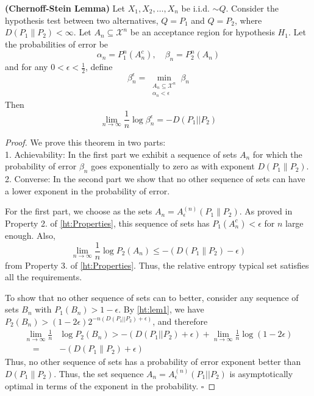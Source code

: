 \documentclass{article}
\newcommand{\bfs}[1]{\textbf{({#1})}}
\begin{document}
\begin{thma}{\bfs{Chernoff-Stein Lemma}}\label{ht:Chernoff-Stein}
Let $X_{1}, X_{2}, \ldots, X_{n}$ be
i.i.d. $\sim Q .$ Consider the hypothesis test between two alternatives, $Q=P_{1}$ and $Q=P_{2}$, where $D\left(P_{1} \| P_{2}\right)<\infty$. Let $A_{n} \subseteq \mathcal{X}^{n}$ be an acceptance region for hypothesis $H_{1} .$ Let the probabilities of error be
$$
\alpha_{n}=P_{1}^{n}\left(A_{n}^{c}\right), \quad \beta_{n}=P_{2}^{n}\left(A_{n}\right)
$$
and for any $0<\epsilon<\frac{1}{2}$, define
$$
\beta_{n}^{\epsilon}=\min _{
\begin{array}{c}
A_{n} \subseteq \mathcal{X}^{n} \\
\alpha_{n}<\epsilon
\end{array}
} \beta_{n}
$$
Then
$$
\lim _{n \rightarrow \infty} \frac{1}{n} \log \beta_{n}^{\epsilon}=-D\left(P_{1}|| P_{2}\right)
$$
\end{thma} 
\begin{proof}
We prove this theorem in two parts:\\
1.  Achievability: In the first part we exhibit a sequence of sets $A_{n}$ for which the probability of error $\beta_{n}$ goes exponentially to zero as with exponent $D\left(P_{1} \| P_{2}\right) .$ \\
2. Converse: In the second part we show that no other sequence of sets can have a lower exponent in the probability of error. 

For the first part, we choose as the sets $A_{n}=A_{\epsilon}^{(n)}\left(P_{1} \| P_{2}\right) .$ As proved in Property 2. of \cref{ht:Properties}, this sequence of sets has $P_{1}\left(A_{n}^{c}\right)<\epsilon$ for $n$ large enough. Also,
$$
\lim _{n \rightarrow \infty} \frac{1}{n} \log P_{2}\left(A_{n}\right) \leq-\left(D\left(P_{1} \| P_{2}\right)-\epsilon\right)
$$
from Property 3. of \cref{ht:Properties}. Thus, the relative entropy typical set satisfies all the requirements.

To show that no other sequence of sets can to better, consider any sequence of sets $B_{n}$ with $P_{1}\left(B_{n}\right)>1-\epsilon$. By \cref{ht:lem1}, we have $P_{2}\left(B_{n}\right)>(1-2 \epsilon) 2^{-n\left(D\left(P_{1}|| P_{2}\right)+\epsilon\right)}$, and therefore
$$
\begin{aligned}
\lim _{n \rightarrow \infty} \frac{1}{n} & \log P_{2}\left(B_{n}\right)>-\left(D\left(P_{1}|| P_{2}\right)+\epsilon\right)+\lim _{n \rightarrow \infty} \frac{1}{n} \log (1-2 \epsilon) \\
\quad=&-\left(D\left(P_{1} \| P_{2}\right)+\epsilon\right)
\end{aligned}
$$
Thus, no other sequence of sets has a probability of error exponent better than $D\left(P_{1} \| P_{2}\right)$. Thus, the set sequence $A_{n}=A_{\epsilon}^{(n)}\left(P_{1}|| P_{2}\right)$ is asymptotically optimal in terms of the exponent in the probability. $\square$
\end{proof}
\end{document}
